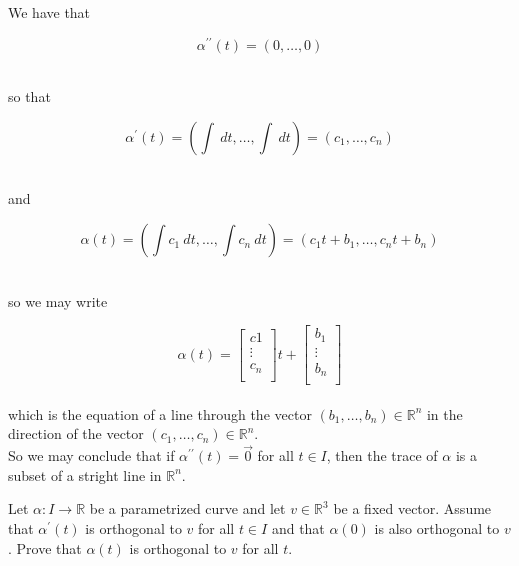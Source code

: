 \documentclass[12pt,letterpaper]{hmcpset}
\begin{document}
\begin{solution}

We have that 

\[ \alpha^{\prime\prime}(t) = (0 , \dots, 0) \]\

so that

\[ \alpha^{\prime}(t) = ( \int\ dt, \dots, \int\ dt) = (c_1,\dots,c_n)\]\

and

\[ \alpha(t) = (\int c_1\ dt, \dots, \int c_n\ dt) = (c_1t + b_1, \dots, c_nt + b_n)\]\

so we may write 

\[ \alpha(t) = 
\left[
\begin{matrix}
c1\\
\vdots\\
c_n\\
\end{matrix}
\right]
t
+
\left[
\begin{matrix}
b_1\\
\vdots\\
b_n\\
\end{matrix}
\right]
\]\\

which is the equation of a line  through the vector $(b_1,\dots,b_n) \in \mathbb{R}^n$ in the direction of the vector $(c_1,\dots,c_n)\in \mathbb{R}^n$.\\

So we may conclude that if $\alpha^{\prime\prime}(t) = \vec0$ for all $t \in I$, then the trace of $\alpha$ is a subset of a stright line in $\mathbb{R}^n$.


\end{solution}

\newpage

\begin{problem}
Let $\alpha: I \to \mathbb{R}$ be a parametrized curve and let $v \in \mathbb{R}^3$ be a fixed vector.  Assume that $\alpha^{\prime}(t)$ is orthogonal to $v$ for all $t \in I$ and that $\alpha(0)$ is also orthogonal to $v$.
Prove that $\alpha(t)$ is orthogonal to $v$ for all $t$.
\end{problem}
\end{document}
